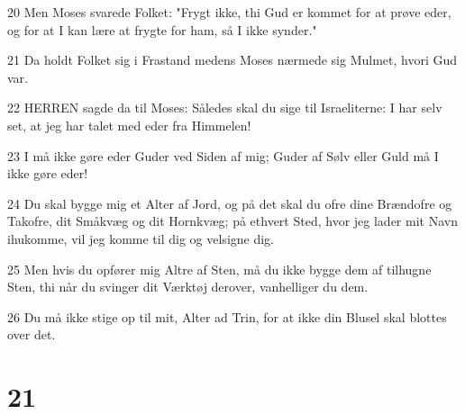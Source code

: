\par 20 Men Moses svarede Folket: "Frygt ikke, thi Gud er kommet for at prøve eder, og for at I kan lære at frygte for ham, så I ikke synder."
\par 21 Da holdt Folket sig i Frastand medens Moses nærmede sig Mulmet, hvori Gud var.
\par 22 HERREN sagde da til Moses: Således skal du sige til Israeliterne: I har selv set, at jeg har talet med eder fra Himmelen!
\par 23 I må ikke gøre eder Guder ved Siden af mig; Guder af Sølv eller Guld må I ikke gøre eder!
\par 24 Du skal bygge mig et Alter af Jord, og på det skal du ofre dine Brændofre og Takofre, dit Småkvæg og dit Hornkvæg; på ethvert Sted, hvor jeg lader mit Navn ihukomme, vil jeg komme til dig og velsigne dig.
\par 25 Men hvis du opfører mig Altre af Sten, må du ikke bygge dem af tilhugne Sten, thi når du svinger dit Værktøj derover, vanhelliger du dem.
\par 26 Du må ikke stige op til mit, Alter ad Trin, for at ikke din Blusel skal blottes over det.

\chapter{21}

